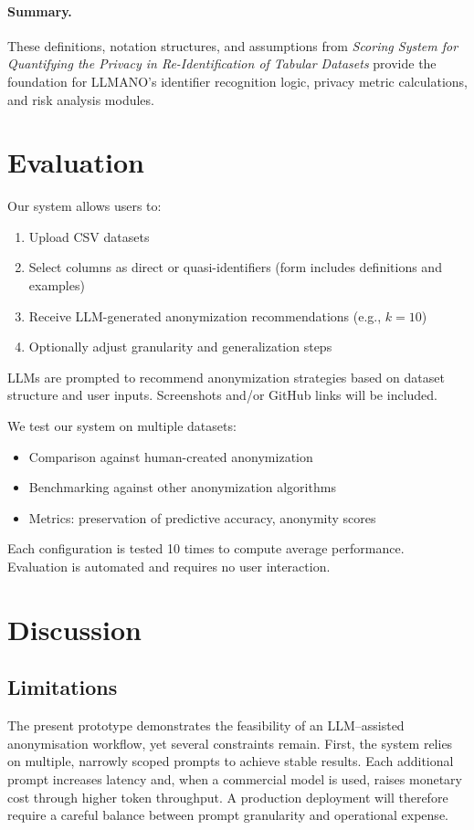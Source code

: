 \documentclass{article}
\begin{document}
\paragraph{Summary.}
These definitions, notation structures, and assumptions from \emph{Scoring System for Quantifying the Privacy in Re-Identification of Tabular Datasets} provide the foundation for LLMANO’s identifier recognition logic, privacy metric calculations, and risk analysis modules.

\section{Evaluation} \label{evaluation}
Our system allows users to:
\begin{enumerate}
    \item Upload CSV datasets
    \item Select columns as direct or quasi-identifiers (form includes definitions and examples)
    \item Receive LLM-generated anonymization recommendations (e.g., $k=10$)
    \item Optionally adjust granularity and generalization steps
\end{enumerate}
LLMs are prompted to recommend anonymization strategies based on dataset structure and user inputs. Screenshots and/or GitHub links will be included.

We test our system on multiple datasets:
\begin{itemize}
    \item Comparison against human-created anonymization
    \item Benchmarking against other anonymization algorithms
    \item Metrics: preservation of predictive accuracy, anonymity scores
\end{itemize}
Each configuration is tested 10 times to compute average performance. Evaluation is automated and requires no user interaction.

\section{Discussion}
\subsection{Limitations}
\label{sec:limitations}

The present prototype demonstrates the feasibility of an LLM–assisted anonymisation workflow, yet several constraints remain.  
First, the system relies on multiple, narrowly scoped prompts to achieve stable results.  Each additional prompt increases latency and, when a commercial model is used, raises monetary cost through higher token throughput.  A production deployment will therefore require a careful balance between prompt granularity and operational expense.  
\end{document}
